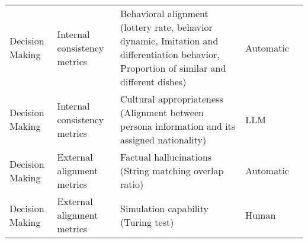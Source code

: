 \begin{small}
\begin{center}
\begin{longtable}{@{}p{}p{}p{}p{}p{}@{}}
Decision Making          & Internal consistency metrics        & Behavioral alignment (lottery rate, behavior dynamic, Imitation and differentiation behavior, Proportion of similar and different dishes)                                                                   & Automatic & \cite{Zhao2023CompeteAIUT}                                                                                                                                                                                                                                                                                                                                                                                                      \\
Decision Making          & Internal consistency metrics        & Cultural appropriateness (Alignment between persona information and its assigned nationality)                                                                                                               & LLM       & \cite{Li2024SchemaGuidedCC}                                                                                                                                                                                                                                                                                                                                                                                       \\
Decision Making          & External alignment metrics          & Factual hallucinations (String matching overlap ratio)                                                                                                                                                      & Automatic & \cite{wang-etal-2024-unleashing}                                                                                                                                                                                                                                                                                                                                                                                             \\
Decision Making          & External alignment metrics          & Simulation capability (Turing test)                                                                                                                                                                         & Human     & \cite{ji2024srap}                                                                                                                                                                                                                                                                                                                                                                                   \\

\end{longtable}
\end{center}
\end{small}
